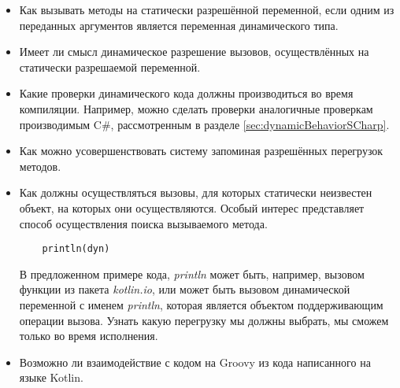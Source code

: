 \begin{itemize}
    \item Как вызывать методы на статически разрешённой переменной, если одним из переданных аргументов является переменная динамического типа.
    \item Имеет ли смысл динамическое разрешение вызовов, осуществлённых на статически разрешаемой переменной.
    \item Какие проверки динамического кода должны производиться во время компиляции.
    Например, можно сделать проверки аналогичные проверкам производимым C\#, рассмотренным в разделе \ref{sec:dynamicBehaviorSCharp}. 
    \item Как можно усовершенствовать систему запоминая разрешённых перегрузок методов.
    \item Как должны осуществляться вызовы, для которых статически неизвестен объект, на которых они осуществляются. Особый интерес представляет способ осуществления поиска вызываемого метода. 
    \begin{verbatim}
    println(dyn)
\end{verbatim}
В предложенном примере кода, \textit{println} может быть, например, вызовом функции из пакета \textit{kotlin.io}, или может быть вызовом динамической переменной с именем \textit{println}, которая является объектом поддерживающим операции вызова. Узнать какую перегрузку мы должны выбрать, мы сможем только во время исполнения.
    \item Возможно ли взаимодействие с кодом на Groovy из кода написанного на языке Kotlin.
\end{itemize}